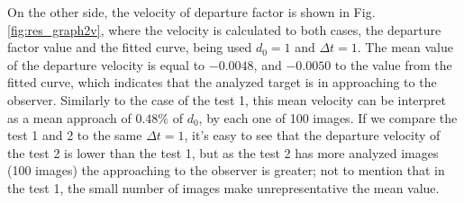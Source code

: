 On the other side, the velocity of departure factor is shown in 
Fig. \ref{fig:res_graph2v}, where the velocity is calculated
to both cases, the departure factor value and the fitted curve, 
being used $d_0=1$ and $\Delta t=1$. The mean value of the departure
velocity is equal to $-0.0048$, and $-0.0050$ to the value from the fitted curve, 
which indicates that the
analyzed  target is in approaching to the observer. Similarly
to the case of the test 1, this mean velocity can be interpret
as a mean approach of $0.48\%$ of $d_0$, by each one of 100 images.
If we compare the test 1 and 2 to the same $\Delta t=1$, it's easy to see
that the departure velocity of the test 2  is lower than the test 1, 
but as the test 2 has more analyzed images (100 images)
the approaching to the observer is greater; 
not to mention that in the test 1, the small number of images 
make  unrepresentative the mean value.




